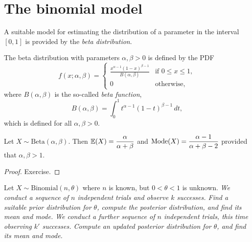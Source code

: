 \section{The binomial model}
A suitable model for estimating the distribution of a parameter in the interval $[0,1]$ is provided by the \emph{beta distribution}.

\begin{definition}\label{def:beta_distribution}
The beta distribution with parameters $\alpha,\beta>0$ is defined by the PDF
\[
f(x;\alpha,\beta) = \begin{cases}
	\displaystyle\frac{x^{\alpha-1}(1-x)^{\beta-1}}{B(\alpha,\beta)} & \text{if $0\leq x\leq 1$}, \\
	0												& \text{otherwise,}
\end{cases}
\]
where $B(\alpha,\beta)$ is the so-called \emph{beta function},
\[
B(\alpha,\beta) = \int_0^1 t^{\alpha-1}(1-t)^{\beta-1}\,dt,
\]
which is defined for all $\alpha,\beta>0$.
\end{definition}


\begin{lemma}
Let $X\sim\text{Beta}(\alpha,\beta)$. Then $\mathbb{E}(X) = \displaystyle\frac{\alpha}{\alpha+\beta}$ and $\text{Mode}(X) = \displaystyle\frac{\alpha-1}{\alpha+\beta-2}$ provided that $\alpha,\beta > 1$.
\end{lemma}

\begin{proof}
Exercise.
\end{proof}

\begin{example}
Let $X\sim\text{Binomial}(n,\theta)$ where $n$ is known, but $0<\theta<1$ is unknown. 
\ben
\it We conduct a sequence of $n$ independent trials and observe $k$ successes. Find a suitable prior distribution for $\theta$, compute the posterior distribution, and find its mean and mode.
\it We conduct a further sequence of $n$ independent trials, this time observing $k'$ successes. Compute an updated posterior distribution for $\theta$, and find its mean and mode.
\een
\end{example}

